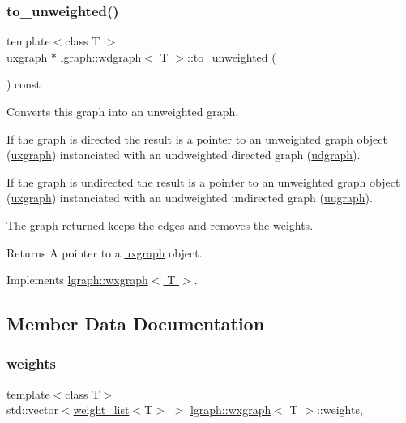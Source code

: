 \subsubsection{\texorpdfstring{to\+\_\+unweighted()}{to\_unweighted()}}
{\footnotesize\ttfamily template$<$class T $>$ \\
\hyperlink{classlgraph_1_1uxgraph}{uxgraph} $\ast$ \hyperlink{classlgraph_1_1wdgraph}{lgraph\+::wdgraph}$<$ T $>$\+::to\+\_\+unweighted (\begin{DoxyParamCaption}{ }\end{DoxyParamCaption}) const\hspace{0.3cm}{\ttfamily [virtual]}}



Converts this graph into an unweighted graph. 

If the graph is directed the result is a pointer to an unweighted graph object (\hyperlink{classlgraph_1_1uxgraph}{uxgraph}) instanciated with an undweighted directed graph (\hyperlink{classlgraph_1_1udgraph}{udgraph}).

If the graph is undirected the result is a pointer to an unweighted graph object (\hyperlink{classlgraph_1_1uxgraph}{uxgraph}) instanciated with an undweighted undirected graph (\hyperlink{classlgraph_1_1uugraph}{uugraph}).

The graph returned keeps the edges and removes the weights.

\begin{DoxyReturn}{Returns}
A pointer to a \hyperlink{classlgraph_1_1uxgraph}{uxgraph} object. 
\end{DoxyReturn}


Implements \hyperlink{classlgraph_1_1wxgraph_a7fcd56f02a50591ba3ce5e5c7792b4aa}{lgraph\+::wxgraph$<$ T $>$}.



\subsection{Member Data Documentation}
\mbox{\label{classlgraph_1_1wxgraph_a6f8c983edc82913c2d78b7bc871defe8}} 
\subsubsection{\texorpdfstring{weights}{weights}}
{\footnotesize\ttfamily template$<$class T$>$ \\
std\+::vector$<$\hyperlink{namespacelgraph_a1e0fd5ef0a78b2a92da48adbed265cb6}{weight\+\_\+list}$<$T$>$ $>$ \hyperlink{classlgraph_1_1wxgraph}{lgraph\+::wxgraph}$<$ T $>$\+::weights\hspace{0.3cm}{\ttfamily [protected]}, {\ttfamily [inherited]}}



